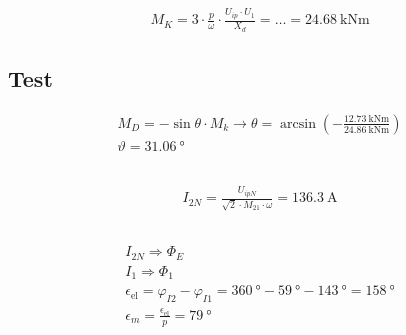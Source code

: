 \documentclass[10pt,a4paper]{article}
\begin{document}
\subsection{}
\begin{align*}
M_K = 3 \cdot \frac{p}{\omega} \cdot \frac{U_{ip} \cdot U_1}{X_d} = \ldots = \SI{24.68}{\kilo\newton\meter}
\end{align*}

\subsection{Test}
\begin{align*}
M_D = - \sin\theta \cdot M_k \rightarrow \theta = \arcsin\left(-\frac{\SI{12.73}{\kilo\newton\meter}}{\SI{24.86}{\kilo\newton\meter}}\right)\\
\vartheta = \SI{31.06}{\degree}
\end{align*}

\subsection{}
\begin{align*}
I_{2N} = \frac{U_{ipN}}{\sqrt{2} \cdot M_{21} \cdot \omega} = \SI{136.3}{\ampere}
\end{align*}

\subsection{}
\begin{align*}
I_{2N} \Rightarrow \Phi_ E\\
I_1 \Rightarrow \Phi_1\\
\epsilon_\text{el} = \varphi_{I2} - \varphi_{I1} = \SI{360}{\degree} - \SI{59}{\degree} - \SI{143}{\degree} = \SI{158}{\degree}\\
\epsilon_m = \frac{\epsilon_\text{el}}{p} = \SI{79}{\degree}
\end{align*}
\end{document}
